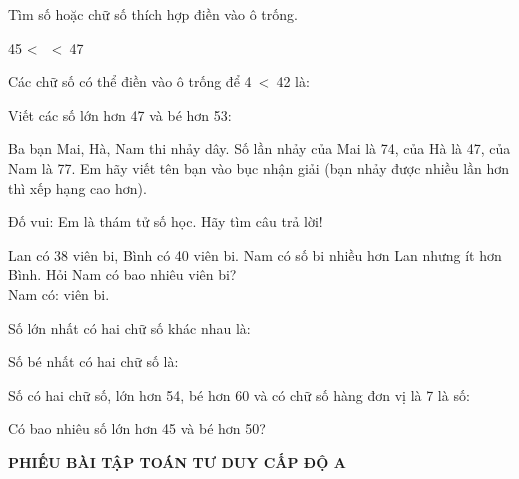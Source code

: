 \documentclass[../main.tex]{subfiles}
\begin{document}
\begin{bt}
    Tìm số hoặc chữ số thích hợp điền vào ô trống.
    \begin{listEX}
        \item 45 \textless\ \ \textless\ 47 
        \item {}
        \item {}
        \item Các chữ số có thể điền vào ô trống để 4\SSo\ \textless\ 42 là: \TTcham[3cm]
        \item Viết các số lớn hơn 47 và bé hơn 53: \TTcham[5cm]
    \end{listEX}
\end{bt}

\begin{bt}
    Ba bạn Mai, Hà, Nam thi nhảy dây. Số lần nhảy của Mai là 74, của Hà là 47, của Nam là 77. Em hãy viết tên bạn vào bục nhận giải (bạn nhảy được nhiều lần hơn thì xếp hạng cao hơn).
    \par\nopagebreak\vspace{4pt}\nopagebreak{\centering\SSbuc\par}
\end{bt}

\begin{bt}
    Đố vui: Em là thám tử số học. Hãy tìm câu trả lời!
    \begin{listEX}
        \item Lan có 38 viên bi, Bình có 40 viên bi. Nam có số bi nhiều hơn Lan nhưng ít hơn Bình. Hỏi Nam có bao nhiêu viên bi?\\[4pt]
        Nam có: \TTcham[2.5cm] viên bi.
        \item Số lớn nhất có hai chữ số khác nhau là: \TTcham[2cm]
        \item Số bé nhất có hai chữ số là: \TTcham[2cm]
        \item Số có hai chữ số, lớn hơn 54, bé hơn 60 và có chữ số hàng đơn vị là 7 là số: \TTcham[2cm]
        \item Có bao nhiêu số lớn hơn 45 và bé hơn 50? \TTcham[2cm]
    \end{listEX}
\end{bt}

\newpage
\TTdatlaibai
{\centering
        {\color{mauchinh!120}\bfseries\Large PHIẾU BÀI TẬP TOÁN TƯ DUY CẤP ĐỘ A}\\[3pt]
        \par}
\vspace{6pt}
\TTthongtin
\end{document}
